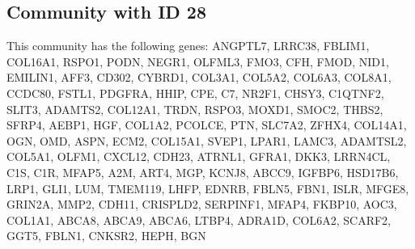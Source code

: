 \subsection*{Community with ID 28}
This community has the following genes: ANGPTL7, LRRC38, FBLIM1, COL16A1, RSPO1, PODN, NEGR1, OLFML3, FMO3, CFH, FMOD, NID1, EMILIN1, AFF3, CD302, CYBRD1, COL3A1, COL5A2, COL6A3, COL8A1, CCDC80, FSTL1, PDGFRA, HHIP, CPE, C7, NR2F1, CHSY3, C1QTNF2, SLIT3, ADAMTS2, COL12A1, TRDN, RSPO3, MOXD1, SMOC2, THBS2, SFRP4, AEBP1, HGF, COL1A2, PCOLCE, PTN, SLC7A2, ZFHX4, COL14A1, OGN, OMD, ASPN, ECM2, COL15A1, SVEP1, LPAR1, LAMC3, ADAMTSL2, COL5A1, OLFM1, CXCL12, CDH23, ATRNL1, GFRA1, DKK3, LRRN4CL, C1S, C1R, MFAP5, A2M, ART4, MGP, KCNJ8, ABCC9, IGFBP6, HSD17B6, LRP1, GLI1, LUM, TMEM119, LHFP, EDNRB, FBLN5, FBN1, ISLR, MFGE8, GRIN2A, MMP2, CDH11, CRISPLD2, SERPINF1, MFAP4, FKBP10, AOC3, COL1A1, ABCA8, ABCA9, ABCA6, LTBP4, ADRA1D, COL6A2, SCARF2, GGT5, FBLN1, CNKSR2, HEPH, BGN
\\
